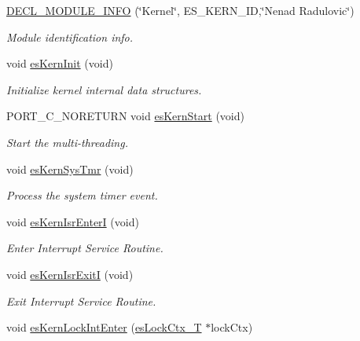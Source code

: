 \begin{DoxyCompactItemize}
\item 
\hyperlink{group__kern__impl_ga52b5266d709bc1ce3ca9b1838f389023}{D\-E\-C\-L\-\_\-\-M\-O\-D\-U\-L\-E\-\_\-\-I\-N\-F\-O} (\char`\"{}Kernel\char`\"{}, E\-S\-\_\-\-K\-E\-R\-N\-\_\-\-I\-D,\char`\"{}Nenad Radulovic\char`\"{})
\begin{DoxyCompactList}\small\item\em Module identification info. \end{DoxyCompactList}\item 
void \hyperlink{group__kern__impl_ga9e9ff699d62d6035cd51121bb3140704}{es\-Kern\-Init} (void)
\begin{DoxyCompactList}\small\item\em Initialize kernel internal data structures. \end{DoxyCompactList}\item 
P\-O\-R\-T\-\_\-\-C\-\_\-\-N\-O\-R\-E\-T\-U\-R\-N void \hyperlink{group__kern__impl_ga0e7a0a6b9c02df58de0f98de0229a09d}{es\-Kern\-Start} (void)
\begin{DoxyCompactList}\small\item\em Start the multi-\/threading. \end{DoxyCompactList}\item 
void \hyperlink{group__kern__impl_ga3182e4c1a47897109d0a429b10a2483e}{es\-Kern\-Sys\-Tmr} (void)
\begin{DoxyCompactList}\small\item\em Process the system timer event. \end{DoxyCompactList}\item 
void \hyperlink{group__kern__impl_gac0d578bcd4a10b2c8e5fc90f0b86ccec}{es\-Kern\-Isr\-Enter\-I} (void)
\begin{DoxyCompactList}\small\item\em Enter Interrupt Service Routine. \end{DoxyCompactList}\item 
void \hyperlink{group__kern__impl_gaa6347925fff1684b5425dd2857c27129}{es\-Kern\-Isr\-Exit\-I} (void)
\begin{DoxyCompactList}\small\item\em Exit Interrupt Service Routine. \end{DoxyCompactList}\item 
void \hyperlink{group__kern__impl_gaa3ca4a02fafcfb840442506f42175a13}{es\-Kern\-Lock\-Int\-Enter} (\hyperlink{group__kern__lock_gad8b2b8257c3bf42c064adb66c0d45e2e}{es\-Lock\-Ctx\-\_\-\-T} $\ast$lock\-Ctx)

\end{DoxyCompactItemize}
